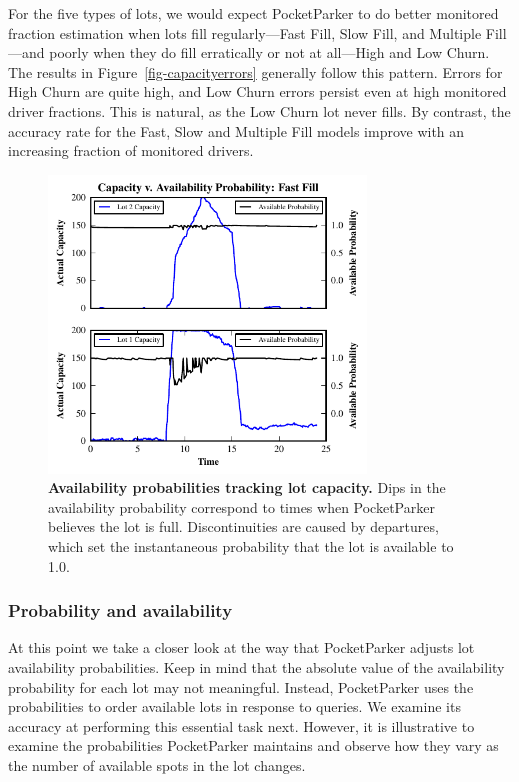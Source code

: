 For the five types of lots, we would expect PocketParker to do better
monitored fraction estimation when lots fill regularly---Fast Fill, Slow
Fill, and Multiple Fill---and poorly when they do fill erratically or not at
all---High and Low Churn. The results in Figure~\ref{fig-capacityerrors}
generally follow this pattern. Errors for High Churn are quite high, and Low
Churn errors persist even at high monitored driver fractions. This is
natural, as the Low Churn lot never fills.  By contrast, the accuracy rate for
the Fast, Slow and Multiple Fill models improve with an increasing fraction of
monitored drivers.

\begin{figure}[t]
\centering
\includegraphics[width=3.325in]{./simulator/figures/tracking_fastfill.pdf}

\caption{\textbf{Availability probabilities tracking lot capacity.} Dips in
the availability probability correspond to times when PocketParker believes
the lot is full. Discontinuities are caused by departures, which set the
instantaneous probability that the lot is available to 1.0.}

\label{fig-trackingexample}
\end{figure}

\subsubsection{Probability and availability}

At this point we take a closer look at the way that PocketParker adjusts lot
availability probabilities. Keep in mind that the absolute value of the
availability probability for each lot may not meaningful. Instead,
PocketParker uses the probabilities to order available lots in response to
queries. We examine its accuracy at performing this essential task next.
However, it is illustrative to examine the probabilities PocketParker
maintains and observe how they vary as the number of available spots in the
lot changes.


